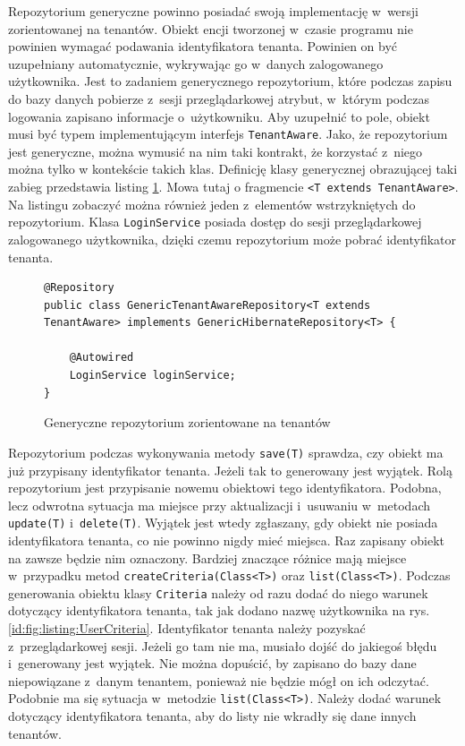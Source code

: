 \documentclass[a4paper]{book}
\begin{document}
{Repozytorium generyczne powinno posiadać swoją implementację w~wersji zorientowanej na tenantów. Obiekt encji tworzonej w~czasie programu nie powinien wymagać podawania identyfikatora tenanta. Powinien on być uzupełniany automatycznie, wykrywając go w~danych zalogowanego użytkownika. Jest to zadaniem generycznego repozytorium, które podczas zapisu do bazy danych pobierze z~sesji przeglądarkowej atrybut, w~którym podczas logowania zapisano informacje o~użytkowniku. Aby uzupełnić to pole, obiekt musi być typem implementującym interfejs \lstinline|TenantAware|. Jako, że repozytorium jest generyczne, można wymusić na nim taki kontrakt, że korzystać z~niego można tylko w kontekście takich klas. Definicję klasy generycznej obrazującej taki zabieg przedstawia listing \ref{id:fig:listing:TenantAwareRepository}. Mowa tutaj o fragmencie \lstinline|<T extends TenantAware>|. Na listingu zobaczyć można również jeden z~elementów wstrzykniętych do repozytorium. Klasa \lstinline|LoginService| posiada dostęp do sesji przeglądarkowej zalogowanego użytkownika, dzięki czemu repozytorium może pobrać identyfikator tenanta.
\begin{figure}
\begin{lstlisting}
@Repository
public class GenericTenantAwareRepository<T extends TenantAware> implements GenericHibernateRepository<T> {

	@Autowired
	LoginService loginService;
}
\end{lstlisting}
\caption{Generyczne repozytorium zorientowane na tenantów}
\label{id:fig:listing:TenantAwareRepository}
\end{figure}

Repozytorium podczas wykonywania metody \lstinline|save(T)| sprawdza, czy obiekt ma już przypisany identyfikator tenanta. Jeżeli tak to generowany jest wyjątek. Rolą repozytorium jest przypisanie nowemu obiektowi tego identyfikatora. Podobna, lecz odwrotna sytuacja ma miejsce przy aktualizacji i~usuwaniu w~metodach \lstinline|update(T)| i~\lstinline|delete(T)|. Wyjątek jest wtedy zgłaszany, gdy obiekt nie posiada identyfikatora tenanta, co nie powinno nigdy mieć miejsca. Raz zapisany obiekt na zawsze będzie nim oznaczony. Bardziej znaczące różnice mają miejsce w~przypadku metod \lstinline|createCriteria(Class<T>)| oraz \lstinline|list(Class<T>)|. Podczas generowania obiek\-tu klasy \lstinline|Criteria| należy od razu dodać do niego warunek dotyczący identyfikatora tenanta, tak jak dodano nazwę użytkownika na rys. \ref{id:fig:listing:UserCriteria}. Identyfikator tenanta należy pozyskać z~przeglądarkowej sesji. Jeżeli go tam nie ma, musiało dojść do jakiegoś błędu i~generowany jest wyjątek. Nie można dopuścić, by zapisano do bazy dane niepowiązane z~danym tenantem, ponieważ nie będzie mógł on ich odczytać. Podobnie ma się sytuacja w~metodzie \lstinline|list(Class<T>)|. Należy dodać warunek dotyczący identyfikatora tenanta, aby do listy nie wkradły się dane innych tenantów.





}
\end{document}
